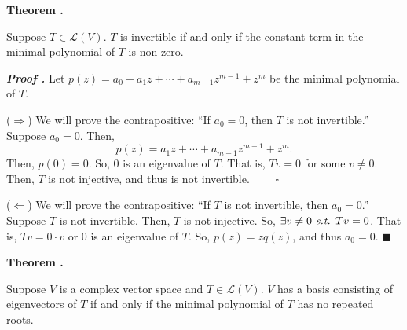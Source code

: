 \documentclass[11pt, letterpaper]{article}
\newcounter{index}[subsection]
\newenvironment*{thm}[1]{\begin{tcolorbox}\par\noindent\textbf{Theorem \thesubsection.\stepcounter{index}\theindex\ #1} \par}{\par\end{tcolorbox}}
\newcounter{nprf}[subsection]
\newenvironment*{prf}{\par\indent\textbf{\textit{Proof \stepcounter{nprf}\thenprf.}}}{\hfill$\blacksquare$\par}
\def\L{\mathcal{L}}
\def\st{\emph{ s.t. }}
\def\pqde{\qquad\square}
\begin{document}
\begin{thm}{}
	Suppose $T\in\L(V)$. $T$ is invertible if and only if the constant term in the minimal polynomial of $T$ is non-zero. 	
\end{thm}
\begin{prf}
	Let $p(z)=a_0+a_1z+\cdots+a_{m-1}z^{m-1}+z^m$ be the minimal polynomial of $T$. 
	\par ($\Rightarrow$) We will prove the contrapositive: ``If $a_0=0$, then $T$ is not invertible.'' Suppose $a_0=0$. Then, \[p(z)=a_1z+\cdots+a_{m-1}z^{m-1}+z^m.\] Then, $p(0)=0$. So, $0$ is an eigenvalue of $T$. That is, $Tv=0$ for some $v\neq0$. Then, $T$ is not injective, and thus is not invertible. $\pqde$
	\par ($\Leftarrow$) We will prove the contrapositive: ``If $T$ is not invertible, then $a_0=0$.'' Suppose $T$ is not invertible. Then, $T$ is not injective. So, $\exists v\neq0\st Tv=0$. That is, $Tv=0\cdot v$ or $0$ is an eigenvalue of $T$. So, $p(z)=zq(z)$, and thus $a_0=0$.
\end{prf}
\begin{thm}{}
	Suppose $V$ is a complex vector space and $T\in\L(V)$. $V$ has a basis consisting of eigenvectors of $T$ if and only if the minimal polynomial of $T$ has no repeated roots. 
\end{thm}

\newpage
\end{document}
